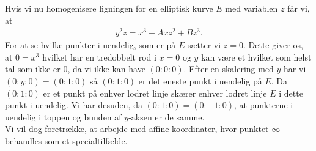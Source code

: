 Hvis vi nu homogenisere ligningen for en elliptisk kurve $E$ med variablen $z$ får vi, at
\begin{align*}
\label{homogeniseret_weierstrass}
	y^2 z = x^3 + Ax z^2 + B z^3.
\end{align*} 
For at se hvilke punkter i uendelig, som er på $E$ sætter vi $z=0$. Dette giver os, at $0 = x^3$ hvilket har en tredobbelt rod i $x=0$ og $y$ kan være et hvilket som helst tal som ikke er $0$, da vi ikke kan have $(0 : 0 : 0)$. 
Efter en skalering med $y$ har vi $(0 : y : 0) = (0 : 1 : 0)$ så $(0 : 1 : 0)$ er det eneste punkt i uendelig på $E$. Da $(0 : 1 : 0)$ er et punkt på enhver lodret linje skærer enhver lodret linje $E$ i dette punkt i uendelig. Vi har desuden, da $(0 : 1 : 0) = (0 : -1 : 0)$, at punkterne i uendelig i toppen og bunden af $y$-aksen er de samme.
\\[10pt]
Vi vil dog foretrække, at arbejde med affine koordinater, hvor punktet $\infty$ behandles som et specialtilfælde.


